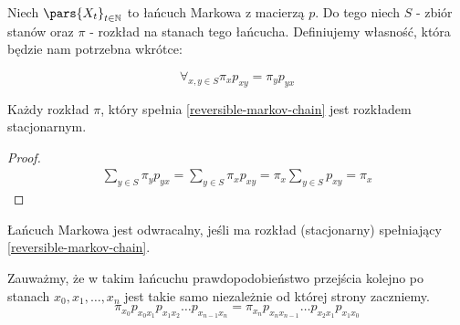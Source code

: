 \begin{definition} \label{reversible-markov-chain}
    Niech \(\pars{X_t}_{t \in \N}\) to łańcuch Markowa z macierzą \(p\).
    Do tego niech \(S\) - zbiór stanów oraz \(\pi\) - rozkład na stanach tego łańcucha.
    Definiujemy własność, która będzie nam potrzebna wkrótce:

    \[
        \forall_{x,y \in S}\pi_xp_{xy} = \pi_yp_{yx}
    \]
\end{definition}

\begin{lemma}
    Każdy rozkład \(\pi\), który spełnia \ref{reversible-markov-chain} jest rozkładem stacjonarnym.
\end{lemma}
\begin{proof}
    \begin{align*}
        \sum_{y \in S}\pi_yp_{yx} = \sum_{y \in S}\pi_xp_{xy} = \pi_x\sum_{y \in S}p_{xy} = \pi_x
    \end{align*}
\end{proof}

\begin{definition}
    Łańcuch Markowa jest odwracalny, jeśli ma rozkład (stacjonarny) spełniający \ref{reversible-markov-chain}.
\end{definition}

Zauważmy, że w takim łańcuchu prawdopodobieństwo przejścia kolejno po stanach \(x_0, x_1, \dots, x_n\) jest takie samo niezależnie od której strony zaczniemy.
\[
    \pi_{x_0}p_{x_0x_1}p_{x_1x_2}\dots p_{x_{n-1}x_n} = \pi_{x_n}p_{x_n x_{n-1}}\dots p_{x_2x_1}p_{x_1x_0}
\]

